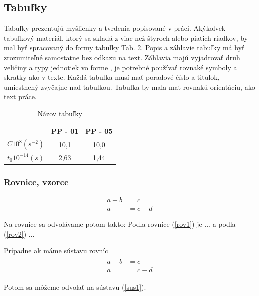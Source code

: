 \subsection{Tabuľky}
Tabuľky prezentujú myšlienky a tvrdenia popisované v práci. Akýkoľvek tabuľkový materiál, ktorý sa skladá z viac než štyroch alebo piatich riadkov, by mal byť spracovaný do formy tabuľky Tab. 2. Popis a záhlavie tabuľky má byť zrozumiteľné samostatne bez odkazu na text. Záhlavia majú vyjadrovať druh veličiny a typy jednotiek vo forme , je potrebné používať rovnaké symboly a skratky ako v texte. Každá tabuľka musí mať poradové číslo a titulok, umiestnený zvyčajne nad tabuľkou. Tabuľka by mala mať rovnakú orientáciu, ako text práce.

\begin{table}[h]
\label{tabulka1}
\caption{Názov tabuľky}
	\centering
		\begin{tabular}{||c||c|c||}
		\hline
		\hline 
		 & PP - 01 & PP - 05 \\
		\hline 
		\hline
		$C 10^8 (s^{-2})$ & 10,1 & 10,0 \\
		\hline
		$t_0 10^{-14} (s)$ & 2,63	& 1,44 \\
		\hline
		\hline 		
		\end{tabular}
\end{table}

\subsubsection{Rovnice, vzorce}

\begin{align}
\label{rov1}
a+b&=c \\
\label{rov2}
a&=c-d
\end{align}

Na rovnice sa odvolávame potom takto: Podľa rovnice (\ref{rov1}) je ... a podľa (\ref{rov2}) ...

Prípadne ak máme sústavu rovníc
\begin{align}
\label{sus1}
\begin{split}
a+b&=c \\
a&=c-d
\end{split}
\end{align}

Potom sa môžeme odvolať na sústavu (\ref{sus1}).

